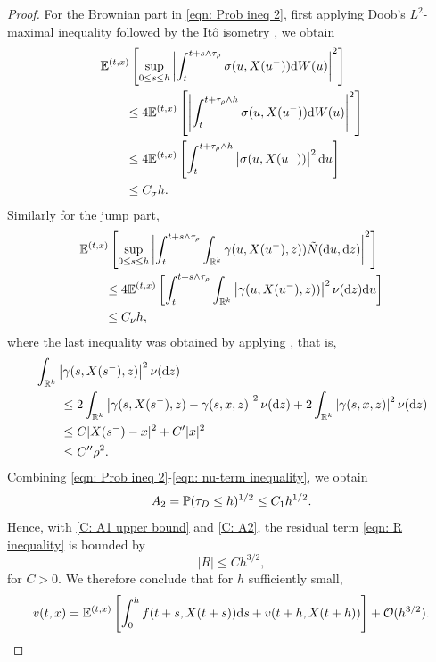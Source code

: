 \begin{proof}
    For the Brownian part in \eqref{eqn: Prob ineq 2}, first applying Doob's $L^2$-maximal inequality \cite[Theorem 3.8 (iv)]{Karatzas1991} followed by the Itô isometry \cite[Theorem 1.17]{oksendal2007applied}, we obtain 
    \begin{align}
        & \mathbb{E}^{(t,x)} \left[\sup_{0 \leq s \leq h} \left| \int_t^{t+s \wedge \tau_\rho } \sigma(u, X(u^-)) \mathrm{d} W(u) \right|^2 \right] \\
        & \qquad \leq 4 \mathbb{E}^{(t,x)} \left[\left| \int_t^{t+ \tau_\rho \wedge h} \sigma(u,X(u^-)) \mathrm{d} W(u) \right|^2 \right] \nonumber \\
        & \qquad \leq 4 \mathbb{E}^{(t,x)} \left[ \int_t^{t+\tau_{\rho} \wedge h} \left|\sigma(u,X(u^-))\right|^2 \mathrm{d} u \right] \nonumber \\
        & \qquad \leq C_\sigma h. 
        \label{eqn: sigma-term inequality}
    \end{align}
    Similarly for the jump part,
    \begin{align}
        & \mathbb{E}^{(t,x)} \left[\sup_{0 \leq s \leq h} \left| \int_t^{t+s \wedge \tau_\rho } \int_{\mathbb{R}^k} \gamma(u,X(u^-),z)) \tilde N(\mathrm{d} u, \mathrm{d} z) \right|^2 \right] \nonumber \\
        & \qquad \leq 4 \mathbb{E}^{(t,x)} \left[\int_t^{t+s \wedge \tau_\rho }  \int_{\mathbb{R}^k} \left|\gamma(u,X(u^-),z))\right|^2 \nu(\mathrm{d} z) \mathrm{d} u \right] \nonumber \\
        & \qquad \leq C_\nu h,
        \label{eqn: nu-term inequality}
    \end{align}
    where the last inequality was obtained by applying , that is, 
    \begin{align*}
        & \int_{\mathbb{R}^k} \left| \gamma(s,X(s^-),z) \right|^2 \nu(\mathrm{d} z) \\
        & \qquad \leq 2 \int_{\mathbb{R}^k} \left| \gamma(s,X(s^-),z) - \gamma(s,x,z) \right|^2 \nu(\mathrm{d} z) + 2 \int_{\mathbb{R}^k}\left|\gamma(s,x,z) \right|^2 \nu(\mathrm{d} z)  \\
        & \qquad \leq C |X(s^-)-x|^2 + C'|x|^2 \\
        & \qquad \leq C'' \rho^2.
    \end{align*}
    Combining \eqref{eqn: Prob ineq 2}-\eqref{eqn: nu-term inequality}, we obtain 
    \begin{equation}
        A_2 = \mathbb{P} (\tau_D \leq h)^{1/2} \leq C_1 h^{1/2}.
        \label{C: A2}
    \end{equation}
    Hence, with \eqref{C: A1 upper bound} and \eqref{C: A2}, the residual term \eqref{eqn: R inequality} is bounded by
    \begin{equation*}
        |R| \leq C h^{3/2},
    \end{equation*}
    for $C>0$. We therefore conclude that for $h$ sufficiently small,
    \begin{equation*}
        v(t,x) = \mathbb{E}^{(t,x)} \left[ \int_0^h f(t+s,X(t+s)) \mathrm{d} s + v(t+h,X(t+h)) \right] + \mathcal{O}(h^{3/2}).
        \qedhere
    \end{equation*} 
\end{proof}